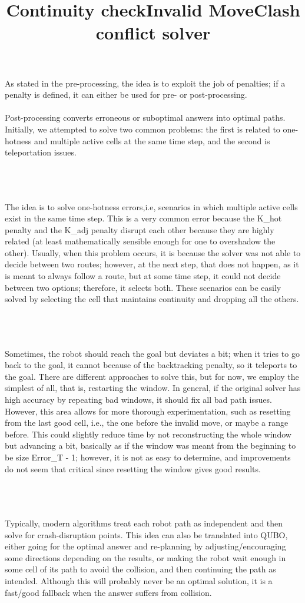 \documentclass[11pt]{article}
\begin{document}
As stated in the pre-processing, the idea is to exploit the job of penalties; if a penalty is defined, it can either be used for pre- or post-processing.\\
\\
Post-processing converts erroneous or suboptimal answers into optimal paths. Initially, we attempted to solve two common problems: the first is related to one-hotness and multiple active cells at the same time step, and the second is teleportation issues.\\ 
\\
\title{\textbf{Continuity check}}\\
\\
The idea is to solve one-hotness errors,i.e, scenarios in which multiple active cells exist in the same time step. This is a very common error because the K\_hot penalty and the K\_adj penalty disrupt each other because they are highly related (at least mathematically sensible enough for one to overshadow the other). Usually, when this problem occurs, it is because the solver was not able to decide between two routes; however, at the next step, that does not happen, as it is meant to always follow a route, but at some time step, it could not decide between two options; therefore, it selects both. These scenarios can be easily solved by selecting the cell that maintains continuity and dropping all the others.\\
\\
\title{\textbf{Invalid Move}}
\\\\
Sometimes, the robot should reach the goal but deviates a bit; when it tries to go back to the goal, it cannot because of the backtracking penalty, so it teleports to the goal. There are different approaches to solve this, but for now, we employ the simplest of all, that is, restarting the window. In general, if the original solver has high accuracy by repeating bad windows, it should fix all bad path issues. However, this area allows for more thorough experimentation, such as resetting from the last good cell, i.e., the one before the invalid move, or maybe a range before. This could slightly reduce time by not reconstructing the whole window but advancing a bit, basically as if the window was meant from the beginning to be size Error\_T - 1; however, it is not as easy to determine, and improvements do not seem that critical since resetting the window gives good results.\\
\\
\title{\textbf{Clash conflict solver}}
\\\\
Typically, modern algorithms treat each robot path as independent and then solve for crash-disruption points. This idea can also be translated into QUBO, either going for the optimal answer and re-planning by adjusting/encouraging some directions depending on the results, or making the robot wait enough in some cell of its path to avoid the collision, and then continuing the path as intended. Although this will probably never be an optimal solution, it is a fast/good fallback when the answer suffers from collision.
\end{document}
